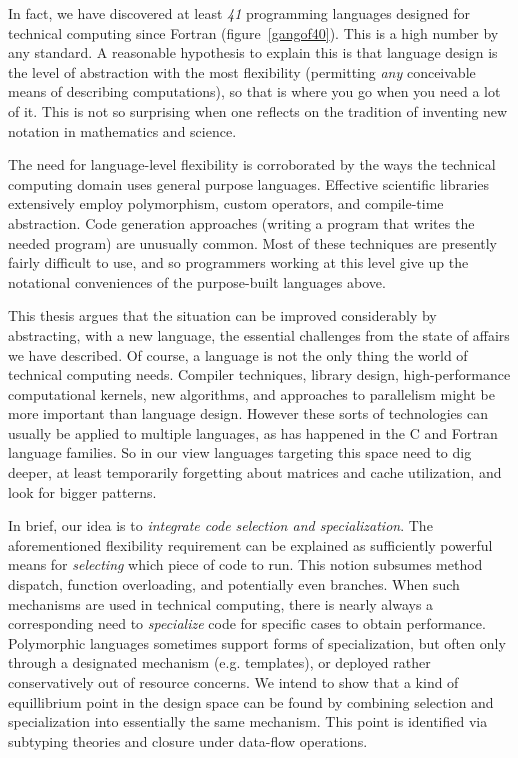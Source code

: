 In fact, we have discovered at least \emph{41} programming languages
designed for technical computing since Fortran (figure~\ref{gangof40}).
This is a high number by any standard. A reasonable hypothesis to
explain this is that language design is the level of abstraction with
the most flexibility (permitting \emph{any} conceivable means of
describing computations), so that is where you go when you need a lot
of it. This is not so surprising when one reflects on the tradition
of inventing new notation in mathematics and science.

The need for language-level flexibility is corroborated by
the ways the technical computing domain uses general purpose
languages.
Effective scientific libraries extensively employ
polymorphism, custom operators, and compile-time abstraction.
Code generation approaches (writing a program that writes the needed
program) are unusually common.
Most of these techniques are presently fairly difficult to use, and so
programmers working at this level give up the notational conveniences
of the purpose-built languages above.



This thesis argues that the situation can be improved considerably by
abstracting, with a new language, the essential challenges from the state
of affairs we have described.
Of course, a language is not the only thing the world of technical
computing needs.
Compiler techniques, library design, high-performance
computational kernels, new algorithms, and approaches to parallelism might
be more important than language design.
However these sorts of technologies can usually be applied to multiple
languages, as has happened in the C and Fortran language families.
So in our view languages targeting this space need to dig deeper,
at least temporarily forgetting about matrices and cache utilization,
and look for bigger patterns.

In brief, our idea is to \emph{integrate code selection and specialization}.
The aforementioned flexibility requirement can be explained as
sufficiently powerful means for \emph{selecting} which piece of code
to run. This notion subsumes method dispatch, function overloading,
and potentially even branches. When such mechanisms are used in
technical computing, there is nearly always a corresponding need to
\emph{specialize} code for specific cases to obtain performance.
Polymorphic languages sometimes support forms of specialization,
but often only through a designated mechanism (e.g. templates), or
deployed rather conservatively out of resource concerns.
We intend to show that a kind of equillibrium point in the design
space can be found by combining selection and specialization
into essentially the same mechanism. This point is identified via
subtyping theories and closure under data-flow operations.



